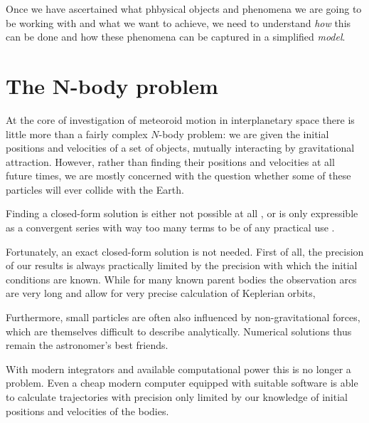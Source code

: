 
Once we have ascertained what phbysical objects and phenomena we are going to be working with and what we want to achieve,
we need to understand \emph{how} this can be done and how these phenomena can be captured in a simplified \emph{model}.


\section{The N-body problem} \label{mN}
    At the core of investigation of meteoroid motion in interplanetary space
    there is little more than a fairly complex $N$-body problem:
    we are given the initial positions and velocities of a set of objects,
    mutually interacting by gravitational attraction.
    However, rather than finding their positions and velocities at all future times, we are mostly concerned
    with the question whether some of these particles will ever collide with the Earth.

    Finding a closed-form solution is either not possible at all \cite{...}, or is only expressible
    as a convergent series with way too many terms to be of any practical use \citep{beloriszky-1930}.

    Fortunately, an exact closed-form solution is not needed. First of all, the precision of our results
    is always practically limited by the precision with which the initial conditions are known.
    While for many known parent bodies the observation arcs are very long and allow for very precise
    calculation of Keplerian orbits,

    Furthermore, small particles are often also influenced by non-gravitational forces,
    which are themselves difficult to describe analytically.
    Numerical solutions thus remain the astronomer's best friends.

    With modern integrators and available computational power this is no longer a problem.
    Even a cheap modern computer equipped with suitable software is able to calculate trajectories
    with precision only limited by our knowledge of initial positions and velocities of the bodies.

